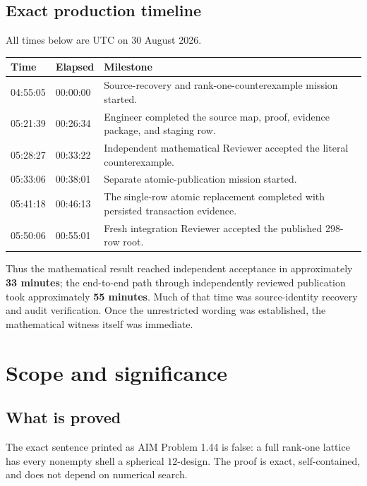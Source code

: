 \documentclass[11pt]{article}
\theoremstyle{argusplain}
\begin{document}
\subsection{Exact production timeline}

All times below are UTC on 30 August 2026.

\begin{center}
\begin{tabularx}{\textwidth}{@{}l l X@{}}
\toprule
Time & Elapsed & Milestone\\
\midrule
04:55:05 & 00:00:00 & Source-recovery and rank-one-counterexample mission started.\\
05:21:39 & 00:26:34 & Engineer completed the source map, proof, evidence package, and staging row.\\
05:28:27 & 00:33:22 & Independent mathematical Reviewer accepted the literal counterexample.\\
05:33:06 & 00:38:01 & Separate atomic-publication mission started.\\
05:41:18 & 00:46:13 & The single-row atomic replacement completed with persisted transaction evidence.\\
05:50:06 & 00:55:01 & Fresh integration Reviewer accepted the published 298-row root.\\
\bottomrule
\end{tabularx}
\end{center}

Thus the mathematical result reached independent acceptance in approximately \textbf{33 minutes}; the end-to-end path through independently reviewed publication took approximately \textbf{55 minutes}. Much of that time was source-identity recovery and audit verification. Once the unrestricted wording was established, the mathematical witness itself was immediate.

\section{Scope and significance}

\subsection{What is proved}

The exact sentence printed as AIM Problem 1.44 is false: a full rank-one lattice has every nonempty shell a spherical $12$-design. The proof is exact, self-contained, and does not depend on numerical search.
\end{document}
